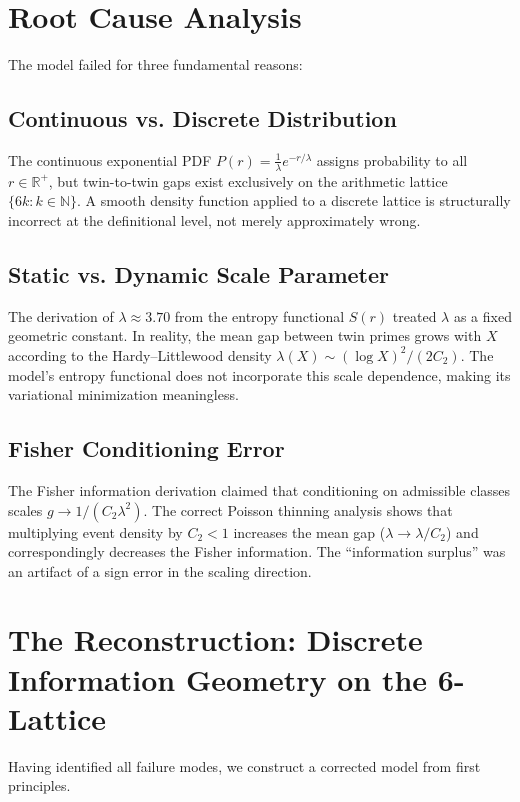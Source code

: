 \documentclass[11pt]{article}
\begin{document}
\section{Root Cause Analysis}
The model failed for three fundamental reasons:

\subsection{Continuous vs. Discrete Distribution}
The continuous exponential PDF $P(r) = \frac{1}{\lambda}e^{-r/\lambda}$ assigns probability to all $r \in \mathbb{R}^+$, but twin-to-twin gaps exist exclusively on the arithmetic lattice $\{6k : k \in \mathbb{N}\}$. A smooth density function applied to a discrete lattice is structurally incorrect at the definitional level, not merely approximately wrong.

\subsection{Static vs. Dynamic Scale Parameter}
The derivation of $\lambda \approx 3.70$ from the entropy functional $S(r)$ treated $\lambda$ as a fixed geometric constant. In reality, the mean gap between twin primes grows with $X$ according to the Hardy--Littlewood density $\lambda(X) \sim (\log X)^2/(2C_2)$. The model's entropy functional does not incorporate this scale dependence, making its variational minimization meaningless.

\subsection{Fisher Conditioning Error}
The Fisher information derivation claimed that conditioning on admissible classes scales $g \to 1/(C_2\lambda^2)$. The correct Poisson thinning analysis shows that multiplying event density by $C_2 < 1$ increases the mean gap ($\lambda \to \lambda/C_2$) and correspondingly decreases the Fisher information. The ``information surplus'' was an artifact of a sign error in the scaling direction.

\section{The Reconstruction: Discrete Information Geometry on the 6-Lattice}
Having identified all failure modes, we construct a corrected model from first principles.
\end{document}
